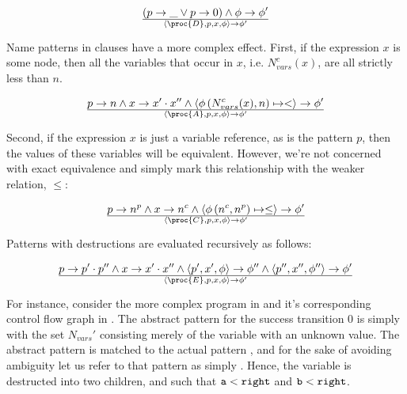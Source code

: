\begin{equation}
{
\left(
    p\rightarrow \_
\vee
    p\rightarrow 0
\right)
  \wedge
    \phi\rightarrow\phi'
}\over{
  \left\langle\proc{D},p,x,\phi\right\rangle
  \rightarrow
  \phi'
}
\end{equation}

Name patterns in clauses have a more complex effect. First, if the expression
$x$ is some node, then all the variables that occur in $x$, i.e.
$N_{vars}^c(x)$, are all strictly less than $n$.

\begin{equation}
{
    p\rightarrow n
  \wedge
    x\rightarrow x'\cdot x''
  \wedge
    \left\langle\phi\left(N_{vars}^c(x), n\right)\mapsto <\right\rangle\rightarrow\phi'
}\over{
  \left\langle\proc{A},p,x,\phi\right\rangle
  \rightarrow
  \phi'
}
\end{equation}

Second, if the expression $x$ is just a variable reference, as is the pattern
$p$, then the values of these variables will be equivalent. However, we're not
concerned with exact equivalence and simply mark this relationship with the
weaker relation, $\leq$:

\begin{equation}
{
    p\rightarrow n^p
  \wedge
    x\rightarrow n^c
  \wedge
    \left\langle\phi\left(n^c, n^p\right)\mapsto \leq\right\rangle\rightarrow\phi'
}\over{
  \left\langle\proc{C},p,x,\phi\right\rangle
  \rightarrow
  \phi'
}
\end{equation}



Patterns with destructions are evaluated recursively as follows:

\begin{equation}
{
    p\rightarrow p'\cdot p''
  \wedge
    x\rightarrow x'\cdot x''
  \wedge
    \left\langle p', x', \phi\right\rangle
    \rightarrow
    \phi''
  \wedge
    \left\langle p'', x'', \phi''\right\rangle
    \rightarrow
    \phi'
}\over{
  \left\langle\proc{E},p,x,\phi\right\rangle
  \rightarrow
  \phi'
}
\end{equation}

For instance, consider the more complex program  in
 and it's corresponding control flow graph in
. The abstract pattern for the success transition 0
is simply  with the set $N_{vars}'$ consisting merely of the
variable  with an unknown value. The abstract pattern is matched to
the actual pattern , and for the sake of avoiding ambiguity
let us refer to that pattern as simply . Hence, the variable is
destructed into two children,  and  such that
$\text{{\ttfamily a}}<\text{{\ttfamily right}}$ and $\text{{\ttfamily b}}<\text{{\ttfamily right}}$.


